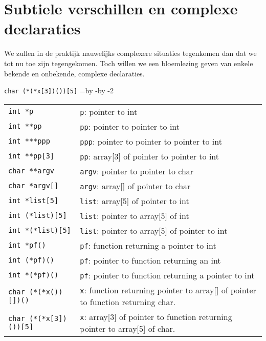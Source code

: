 \section{Subtiele verschillen en complexe declaraties}
We zullen in de praktijk nauwelijks complexere situaties tegenkomen dan dat we tot nu toe zijn tegengekomen. Toch willen we een bloemlezing geven van enkele bekende en onbekende, complexe declaraties.

\hbox{\texttt{char (*(*x[3])())[5]}}
\newdimen\delengte\delengte=\textwidth\advance\delengte by -\advance\delengte by -2\tabcolsep
\begin{table}[!ht]
\begin{tabular}{@{}lp{\delengte}@{}}
\texttt{int *p} & \texttt{p}: pointer to int\\
\texttt{int **pp} & \texttt{pp}: pointer to pointer to int \\
\texttt{int ***ppp} & \texttt{ppp}: pointer to pointer to pointer to int \\
\texttt{int **pp[3]} & \texttt{pp}: array[3] of pointer to pointer to int \\
\texttt{char **argv} & \texttt{argv}: pointer to pointer to char \\
\texttt{char *argv[]} &\texttt{argv}: array[] of pointer to char \\
\texttt{int *list[5]} & \texttt{list}: array[5] of pointer to int \\
\texttt{int (*list)[5]} & \texttt{list}: pointer to array[5] of int \\
\texttt{int *(*list)[5]} & \texttt{list}: pointer to array[5] of pointer to int \\
\texttt{int *pf()} & \texttt{pf}: function returning a pointer to int \\
\texttt{int (*pf)()} & \texttt{pf}: pointer to function returning an int \\
\texttt{int *(*pf)()} & \texttt{pf}: pointer to function returning a pointer to int \\
\texttt{char (*(*x())[])()} & \texttt{x}: function returning pointer to array[] of pointer to function returning char.\\
\texttt{char (*(*x[3])())[5]} & \texttt{x}: array[3] of pointer to function returning pointer to array[5] of char.\\
\end{tabular}
\end{table}
